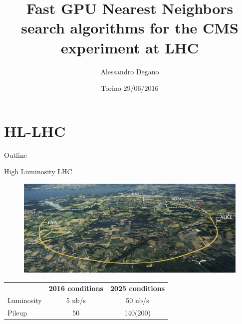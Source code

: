 \documentclass{beamer}
\title[Ph.D. Defense]
{Fast GPU Nearest Neighbors search algorithms for the CMS experiment at LHC}
\author[Alessandro Degano] 
{Alessandro Degano}
\institute[Università degli Studi di Torino]
\date[29/06/2016] %
{Torino 29/06/2016}
\begin{document}
\maketitle

\section{HL-LHC}

\begin{frame}{Outline}
	\tableofcontents
\end{frame}

\begin{frame}{High Luminosity LHC}
\begin{figure}
\begin{center}
\includegraphics[scale=0.25]{images/lhc.jpg}
\end{center}
\end{figure}

\begin{tabular}{l c c}
 & \textbf{2016 conditions} & \textbf{2025 conditions} \\
\hspace{1cm}
Luminosity & 5 nb/s &  50 nb/s \\
\hspace{1cm}
Pileup & 50 & 140(200) \\
\end{tabular}

\end{frame}
\end{document}
